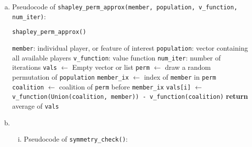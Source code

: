 {\begin{enumerate}[a)]
    Pseudocode of \texttt{shapley\_perm(member, population, v\_function)}:
	
	\begin{algorithm}[h]
		\caption{\texttt{shapley\_perm()}}
		\begin{algorithmic}[1]
			\Require \texttt{member}: individual player, or feature of interest
			\Require \texttt{population}: vector containing all available players
			\Require \texttt{v\_function}: Some value function
			\State \texttt{all\_perms} $\gets$ All permutations of \texttt{population}
			\State \texttt{F} $\gets$ length of \texttt{population}
			\State \texttt{result} $\gets$ 0
			\State \texttt{member\_ix} $\gets$ index of \texttt{member} in \texttt{perm}
			\State \texttt{coalition} $\gets$ coalition of \texttt{perm} before \texttt{member\_ix}
			\State \texttt{diff} $\gets$ \texttt{v\_function(Union(coalition, member)) - v\_function(coalition)}
			\State \texttt{result} $\gets$ \texttt{result + diff}
			\EndFor
			\State \textbf{return} \texttt{result / F!}
		\end{algorithmic}
	\end{algorithm}

	\item
    Pseudocode of \texttt{shapley\_perm\_approx(member, population, v\_function, num\_iter)}:
	
	\begin{algorithm}[H]
		\caption{\texttt{shapley\_perm\_approx()}}
		\begin{algorithmic}[1]
			\Require \texttt{member}: individual player, or feature of interest
			\Require \texttt{population}: vector containing all available players
			\Require \texttt{v\_function}: value function
			\Require \texttt{num\_iter}: number of iterations
            \State \texttt{vals} $\gets$ Empty vector or list
			\State \texttt{perm} $\gets$ draw a random permutation of \texttt{population}
			\State \texttt{member\_ix} $\gets$ index of \texttt{member} in \texttt{perm}
			\State \texttt{coalition} $\gets$ coalition of \texttt{perm} before \texttt{member\_ix}
			\State \texttt{vals[i]} $\gets$ \texttt{v\_function(Union(coalition, member)) - v\_function(coalition)}
			\EndFor
			\State \textbf{return} average of \texttt{vals}
		\end{algorithmic}
	\end{algorithm}
	
	\item 
	\begin{enumerate}[(i)]
	\item Pseudocode of \texttt{symmetry\_check()}:
	

\end{enumerate}
\end{enumerate}}
